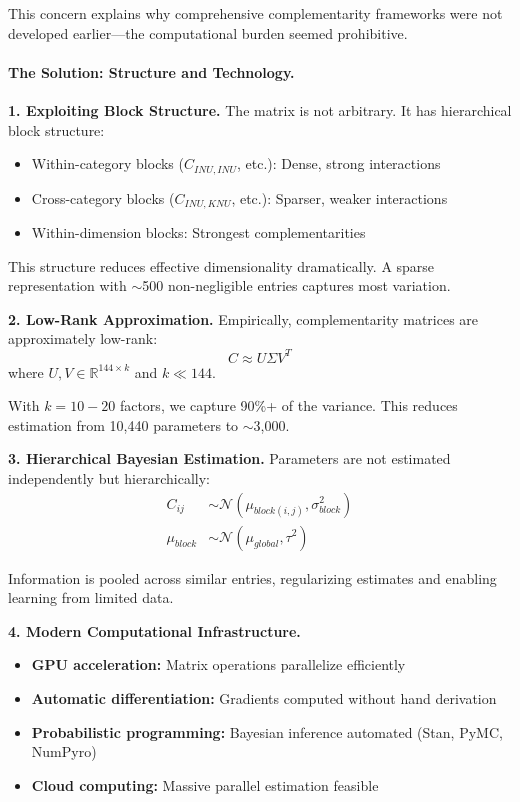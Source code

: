 \documentclass[12pt,a4paper]{article}
\begin{document}
This concern explains why comprehensive complementarity frameworks
were not developed earlier---the computational burden seemed prohibitive.

\paragraph{The Solution: Structure and Technology.}

\textbf{1. Exploiting Block Structure.}
The matrix is not arbitrary. It has hierarchical block structure:
\begin{itemize}
  \item Within-category blocks ($C_{INU,INU}$, etc.): Dense, strong interactions
  \item Cross-category blocks ($C_{INU,KNU}$, etc.): Sparser, weaker interactions
  \item Within-dimension blocks: Strongest complementarities
\end{itemize}

This structure reduces effective dimensionality dramatically.
A sparse representation with $\sim$500 non-negligible entries captures most variation.

\textbf{2. Low-Rank Approximation.}
Empirically, complementarity matrices are approximately low-rank:
\begin{equation}
  C \approx U \Sigma V^T
\end{equation}
where $U, V \in \mathbb{R}^{144 \times k}$ and $k \ll 144$.

With $k = 10-20$ factors, we capture 90\%+ of the variance.
This reduces estimation from 10,440 parameters to $\sim$3,000.

\textbf{3. Hierarchical Bayesian Estimation.}
Parameters are not estimated independently but hierarchically:
\begin{align}
  C_{ij} &\sim \mathcal{N}(\mu_{block(i,j)}, \sigma^2_{block}) \\
  \mu_{block} &\sim \mathcal{N}(\mu_{global}, \tau^2)
\end{align}

Information is pooled across similar entries, regularizing estimates
and enabling learning from limited data.

\textbf{4. Modern Computational Infrastructure.}
\begin{itemize}
  \item \textbf{GPU acceleration:} Matrix operations parallelize efficiently
  \item \textbf{Automatic differentiation:} Gradients computed without hand derivation
  \item \textbf{Probabilistic programming:} Bayesian inference automated (Stan, PyMC, NumPyro)
  \item \textbf{Cloud computing:} Massive parallel estimation feasible
\end{itemize}
\end{document}
